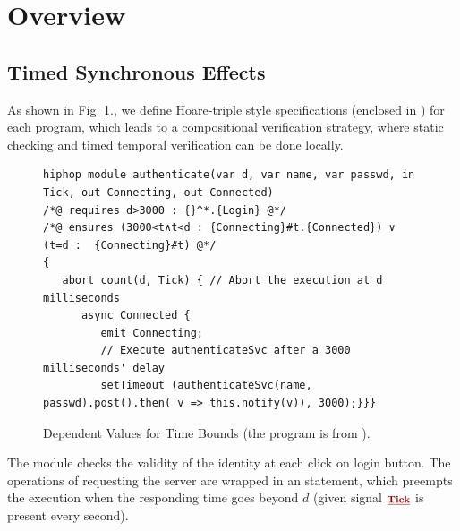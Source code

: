 \documentclass[acmsmall,review,anonymous]{acmart}\settopmatter{printfolios=true,printccs=false,printacmref=false}
\newcommand{\anyevent}[1]{{\textcolor{darkred}
{\underline{\textbf{\footnotesize #1}}}}}
\newcommand{\code}[1]{{\tt{\ensuremath{\m{#1}}}}}
\newcommand{\m}{\mathit}
\newcommand\figref[1]{Fig. \textcolor{black}{\ref{#1}}.}
\begin{document}

%






\section{Overview}\label{sec:Overview}

\subsection{Timed Synchronous Effects}
As shown in \figref{fig:overview_eg1}, we define Hoare-triple style specifications (enclosed in \textcolor{darklavender}{}) for each program, which leads to a compositional verification strategy, where static checking and timed temporal verification can be done locally. %

\begin{figure}[h]
      \vspace{0mm}
\begin{lstlisting}[columns=fullflexible]
hiphop module authenticate(var d, var name, var passwd, in Tick, out Connecting, out Connected)
/*@ requires d>3000 : {}^*.{Login} @*/
/*@ ensures	(3000<t∧t<d : {Connecting}#t.{Connected}) ∨ (t=d :  {Connecting}#t) @*/
{
   abort count(d, Tick) { // Abort the execution at d milliseconds
      async Connected {
         emit Connecting; 
         // Execute authenticateSvc after a 3000 milliseconds' delay
         setTimeout (authenticateSvc(name, passwd).post().then( v => this.notify(v)), 3000);}}}
\end{lstlisting}  
      \vspace{0mm}
      \caption{Dependent Values for Time Bounds (the program is from  \cite{berry2020hiphop}).}\label{fig:overview_eg1}
         \vspace{0mm}
\end{figure}


The {} module checks the validity of the identity at each click on login button. The operations of requesting the server are wrapped in an {\textbf{\color{purple}}} statement, which preempts the execution when the responding time goes beyond \code{\m{d}} (given signal \code{\anyevent{Tick}} is present every second).
\end{document}
